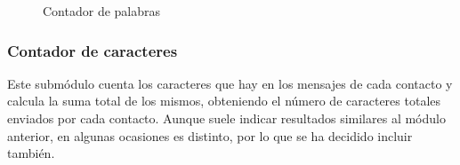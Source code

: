\begin{figure}[H]
	\centering
	\qquad
	\caption{Contador de palabras}
	\label{fig:chap4:word_count}
\end{figure}

\subsubsection{Contador de caracteres}

Este submódulo cuenta los caracteres que hay en los mensajes de cada contacto y calcula la suma total de los mismos, obteniendo el número de caracteres totales enviados por cada contacto. Aunque suele indicar resultados similares al módulo anterior, en algunas ocasiones es distinto, por lo que se ha decidido incluir también.

